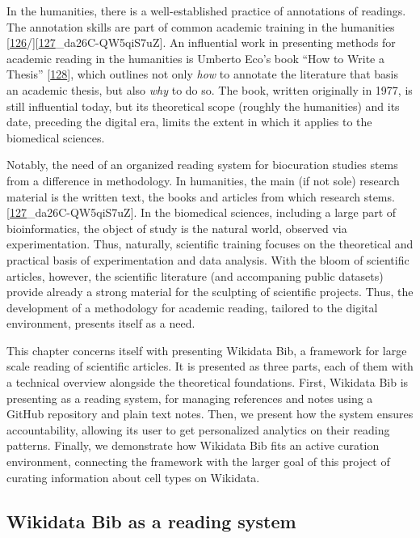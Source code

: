 In the humanities, there is a well-established practice of annotations of readings.
The annotation skills are part of common academic training in the humanities {[}\protect\hyperlink{ref-rPKBwmYh}{126}/{]}{[}\protect\hyperlink{ref-PKhuVRW8}{127}\_da26C-QW5qiS7uZ{]}.
An influential work in presenting methods for academic reading in the humanities is Umberto Eco's book ``How to Write a Thesis'' {[}\protect\hyperlink{ref-1HBVPtZGp}{128}{]}, which outlines not only \emph{how} to annotate the literature that basis an academic thesis, but also \emph{why} to do so.
The book, written originally in 1977, is still influential today, but its theoretical scope (roughly the humanities) and its date, preceding the digital era, limits the extent in which it applies to the biomedical sciences.

Notably, the need of an organized reading system for biocuration studies stems from a difference in methodology.
In humanities, the main (if not sole) research material is the written text, the books and articles from which research stems. {[}\protect\hyperlink{ref-PKhuVRW8}{127}\_da26C-QW5qiS7uZ{]}.
In the biomedical sciences, including a large part of bioinformatics, the object of study is the natural world, observed via experimentation.
Thus, naturally, scientific training focuses on the theoretical and practical basis of experimentation and data analysis.
With the bloom of scientific articles, however, the scientific literature (and accompaning public datasets) provide already a strong material for the sculpting of scientific projects.
Thus, the development of a methodology for academic reading, tailored to the digital environment, presents itself as a need.

This chapter concerns itself with presenting Wikidata Bib, a framework for large scale reading of scientific articles.
It is presented as three parts, each of them with a technical overview alongside the theoretical foundations.
First, Wikidata Bib is presenting as a reading system, for managing references and notes using a GitHub repository and plain text notes.
Then, we present how the system ensures accountability, allowing its user to get personalized analytics on their reading patterns.
Finally, we demonstrate how Wikidata Bib fits an active curation environment, connecting the framework with the larger goal of this project of curating information about cell types on Wikidata.

\hypertarget{wikidata-bib-as-a-reading-system}{%
\subsection{Wikidata Bib as a reading system}\label{wikidata-bib-as-a-reading-system}}

